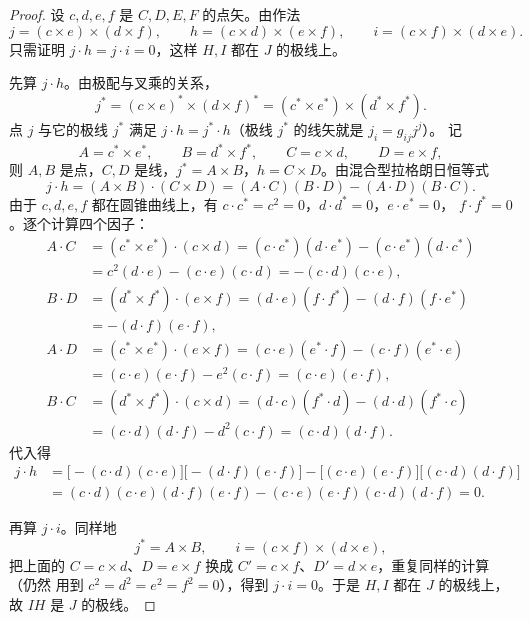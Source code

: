 \begin{proof}
设 $c,d,e,f$ 是 $C,D,E,F$ 的点矢。由作法
\[
j=(c\times e)\times(d\times f),\qquad h=(c\times d)\times(e\times f),\qquad
i=(c\times f)\times(d\times e).
\]
只需证明 $j\cdot h=j\cdot i=0$，这样 $H,I$ 都在 $J$ 的极线上。

先算 $j\cdot h$。由极配与叉乘的关系，
\[
j^*=(c\times e)^*\times(d\times f)^*=(c^*\times e^*)\times(d^*\times f^*).
\]
点 $j$ 与它的极线 $j^*$ 满足 $j\cdot h=j^*\cdot h$（极线 $j^*$ 的线矢就是 $j_i=g_{ij}j^j$）。
记
\[
A=c^*\times e^*,\qquad B=d^*\times f^*,\qquad C=c\times d,\qquad D=e\times f,
\]
则 $A,B$ 是点，$C,D$ 是线，$j^*=A\times B$，$h=C\times D$。由混合型拉格朗日恒等式
\[
j\cdot h=(A\times B)\cdot(C\times D)=(A\cdot C)(B\cdot D)-(A\cdot D)(B\cdot C).
\]
由于 $c,d,e,f$ 都在圆锥曲线上，有 $c\cdot c^*=c^2=0$，$d\cdot d^*=0$，$e\cdot e^*=0$，
$f\cdot f^*=0$。逐个计算四个因子：
\begin{align*}
A\cdot C&=(c^*\times e^*)\cdot(c\times d)
=(c\cdot c^*)(d\cdot e^*)-(c\cdot e^*)(d\cdot c^*)\\
&=c^2(d\cdot e)-(c\cdot e)(c\cdot d)=-(c\cdot d)(c\cdot e),\\
B\cdot D&=(d^*\times f^*)\cdot(e\times f)
=(d\cdot e)(f\cdot f^*)-(d\cdot f)(f\cdot e^*)\\
&=-(d\cdot f)(e\cdot f),\\
A\cdot D&=(c^*\times e^*)\cdot(e\times f)
=(c\cdot e)(e^*\cdot f)-(c\cdot f)(e^*\cdot e)\\
&=(c\cdot e)(e\cdot f)-e^2(c\cdot f)=(c\cdot e)(e\cdot f),\\
B\cdot C&=(d^*\times f^*)\cdot(c\times d)
=(d\cdot c)(f^*\cdot d)-(d\cdot d)(f^*\cdot c)\\
&=(c\cdot d)(d\cdot f)-d^2(c\cdot f)=(c\cdot d)(d\cdot f).
\end{align*}
代入得
\begin{align*}
j\cdot h&=\bigl[-(c\cdot d)(c\cdot e)\bigr]\bigl[-(d\cdot f)(e\cdot f)\bigr]
-\bigl[(c\cdot e)(e\cdot f)\bigr]\bigl[(c\cdot d)(d\cdot f)\bigr]\\
&=(c\cdot d)(c\cdot e)(d\cdot f)(e\cdot f)-(c\cdot e)(e\cdot f)(c\cdot d)(d\cdot f)=0 .
\end{align*}

再算 $j\cdot i$。同样地
\[
j^*=A\times B,\qquad i=(c\times f)\times(d\times e),
\]
把上面的 $C=c\times d$、$D=e\times f$ 换成 $C'=c\times f$、$D'=d\times e$，重复同样的计算（仍然
用到 $c^2=d^2=e^2=f^2=0$），得到 $j\cdot i=0$。于是 $H,I$ 都在 $J$ 的极线上，故 $IH$ 是 $J$
的极线。
\end{proof}

